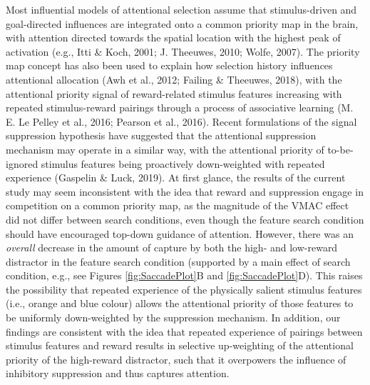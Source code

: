 \documentclass[jou, a4paper, noextraspace,floatsintext]{apa6}
\theoremstyle{definition}
\theoremstyle{definition}
\theoremstyle{definition}
\theoremstyle{remark}
\begin{document}
Most influential models of attentional selection assume that
stimulus-driven and goal-directed influences are integrated onto a
common priority map in the brain, with attention directed towards the
spatial location with the highest peak of activation (e.g., Itti \&
Koch, 2001; J. Theeuwes, 2010; Wolfe, 2007). The priority map concept
has also been used to explain how selection history influences
attentional allocation (Awh et al., 2012; Failing \& Theeuwes, 2018),
with the attentional priority signal of reward-related stimulus features
increasing with repeated stimulus-reward pairings through a process of
associative learning (M. E. Le Pelley et al., 2016; Pearson et al.,
2016). Recent formulations of the signal suppression hypothesis have
suggested that the attentional suppression mechanism may operate in a
similar way, with the attentional priority of to-be-ignored stimulus
features being proactively down-weighted with repeated experience
(Gaspelin \& Luck, 2019). At first glance, the results of the current
study may seem inconsistent with the idea that reward and suppression
engage in competition on a common priority map, as the magnitude of the
VMAC effect did not differ between search conditions, even though the
feature search condition should have encouraged top-down guidance of
attention. However, there was an \emph{overall} decrease in the amount
of capture by both the high- and low-reward distractor in the feature
search condition (supported by a main effect of search condition, e.g.,
see Figures \ref{fig:SaccadePlot}B and \ref{fig:SaccadePlot}D). This
raises the possibility that repeated experience of the physically
salient stimulus features (i.e., orange and blue colour) allows the
attentional priority of those features to be uniformly down-weighted by
the suppression mechanism. In addition, our findings are consistent with
the idea that repeated experience of pairings between stimulus features
and reward results in selective up-weighting of the attentional priority
of the high-reward distractor, such that it overpowers the influence of
inhibitory suppression and thus captures attention.
\end{document}
